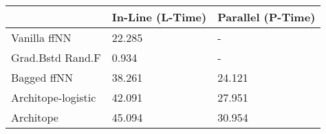\begin{tabular}{lll}
\toprule
{} & In-Line (L-Time) & Parallel (P-Time) \\
\midrule
Vanilla ffNN       &           22.285 &                 - \\
Grad.Bstd Rand.F   &            0.934 &                 - \\
Bagged ffNN        &           38.261 &            24.121 \\
Architope-logistic &           42.091 &            27.951 \\
Architope          &           45.094 &            30.954 \\
\bottomrule
\end{tabular}
